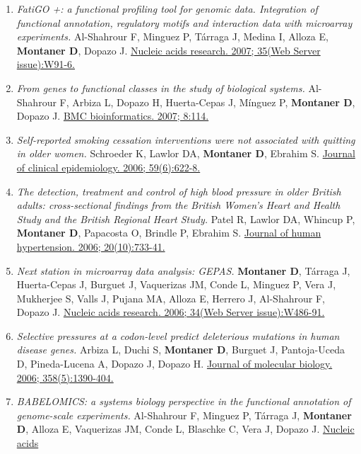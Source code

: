 \begin{enumerate}
{  2007; 1(10):432-5.}
\item
  \emph{FatiGO +: a functional profiling tool for genomic data.
  Integration of functional annotation, regulatory motifs and
  interaction data with microarray experiments.} Al-Shahrour F, Minguez
  P, Tárraga J, Medina I, Alloza E, \textbf{Montaner D}, Dopazo J.
  \href{http://www.ncbi.nlm.nih.gov//pubmed/17478504}{Nucleic acids
  research. 2007; 35(Web Server issue):W91-6.}
\item
  \emph{From genes to functional classes in the study of biological
  systems.} Al-Shahrour F, Arbiza L, Dopazo H, Huerta-Cepas J, Mínguez
  P, \textbf{Montaner D}, Dopazo J.
  \href{http://www.ncbi.nlm.nih.gov//pubmed/17407596}{BMC
  bioinformatics. 2007; 8:114.}
\item
  \emph{Self-reported smoking cessation interventions were not
  associated with quitting in older women.} Schroeder K, Lawlor DA,
  \textbf{Montaner D}, Ebrahim S.
  \href{http://www.ncbi.nlm.nih.gov//pubmed/16713525}{Journal of
  clinical epidemiology. 2006; 59(6):622-8.}
\item
  \emph{The detection, treatment and control of high blood pressure in
  older British adults: cross-sectional findings from the British
  Women's Heart and Health Study and the British Regional Heart Study.}
  Patel R, Lawlor DA, Whincup P, \textbf{Montaner D}, Papacosta O,
  Brindle P, Ebrahim S.
  \href{http://www.ncbi.nlm.nih.gov//pubmed/16855626}{Journal of human
  hypertension. 2006; 20(10):733-41.}
\item
  \emph{Next station in microarray data analysis: GEPAS.}
  \textbf{Montaner D}, Tárraga J, Huerta-Cepas J, Burguet J, Vaquerizas
  JM, Conde L, Minguez P, Vera J, Mukherjee S, Valls J, Pujana MA,
  Alloza E, Herrero J, Al-Shahrour F, Dopazo J.
  \href{http://www.ncbi.nlm.nih.gov//pubmed/16845056}{Nucleic acids
  research. 2006; 34(Web Server issue):W486-91.}
\item
  \emph{Selective pressures at a codon-level predict deleterious
  mutations in human disease genes.} Arbiza L, Duchi S, \textbf{Montaner
  D}, Burguet J, Pantoja-Uceda D, Pineda-Lucena A, Dopazo J, Dopazo H.
  \href{http://www.ncbi.nlm.nih.gov//pubmed/16584746}{Journal of
  molecular biology. 2006; 358(5):1390-404.}
\item
  \emph{BABELOMICS: a systems biology perspective in the functional
  annotation of genome-scale experiments.} Al-Shahrour F, Minguez P,
  Tárraga J, \textbf{Montaner D}, Alloza E, Vaquerizas JM, Conde L,
  Blaschke C, Vera J, Dopazo J.
  \href{http://www.ncbi.nlm.nih.gov//pubmed/16845052}{Nucleic acids
}
\end{enumerate}
